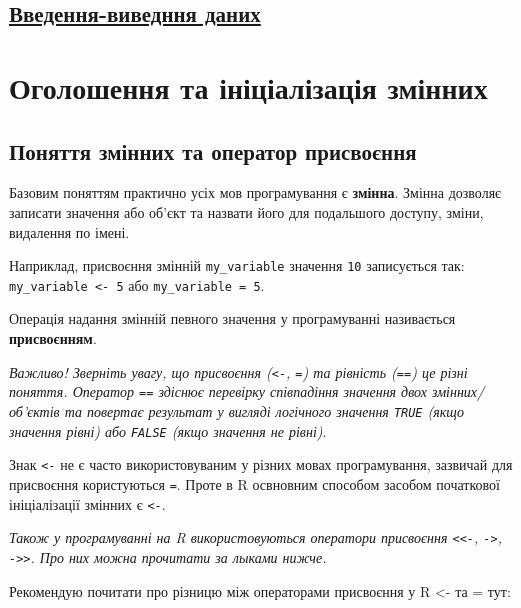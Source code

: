 \documentclass[
]{book}
\begin{document}
\begin{itemize}
\begin{itemize}
{    \section{\texorpdfstring{\protect\hyperlink{chapter245}{Введення-виведння даних}}{Введення-виведння даних}}\label{ux432ux432ux435ux434ux435ux43dux43dux44f-ux432ux438ux432ux435ux434ux43dux43dux44f-ux434ux430ux43dux438ux445}}
  \end{itemize}
\end{itemize}

\hypertarget{chapter21}{%
\section{Оголошення та ініціалізація змінних}\label{chapter21}}

\hypertarget{chapter211}{%
\subsection{Поняття змінних та оператор присвоєння}\label{chapter211}}

Базовим поняттям практично усіх мов програмування є \textbf{змінна}. Змінна дозволяє записати значення або об'єкт та назвати його для подальшого доступу, зміни, видалення по імені.

Наприклад, присвоєння змінній \texttt{my\_variable} значення \texttt{10} записується так: \texttt{my\_variable\ \textless{}-\ 5} або \texttt{my\_variable\ =\ 5}.

Операція надання змінній певного значення у програмуванні називається \textbf{присвоєнням}.

\emph{Важливо! Зверніть увагу, що присвоєння (\texttt{\textless{}-}, \texttt{=}) та рівність (\texttt{==}) це різні поняття. Оператор \texttt{==} здіснює перевірку співпадіння значення двох змінних/об'єктів та повертає результат у вигляді логічного значення \texttt{TRUE} (якщо значення рівні) або \texttt{FALSE} (якщо значення не рівні)}.

Знак \texttt{\textless{}-} не є часто використовуваним у різних мовах програмування, зазвичай для присвоєння користуються \texttt{=}. Проте в R освновним способом засобом початкової ініціалізації змінних є \texttt{\textless{}-}.

\emph{Також у програмуванні на R використовуються оператори присвоєння \texttt{\textless{}\textless{}-}, \texttt{-\textgreater{}}, \texttt{-\textgreater{}\textgreater{}}. Про них можна прочитати за лыками нижче.}

Рекомендую почитати про різницю між операторами присвоєння у R \textless- та = тут:
\end{document}
